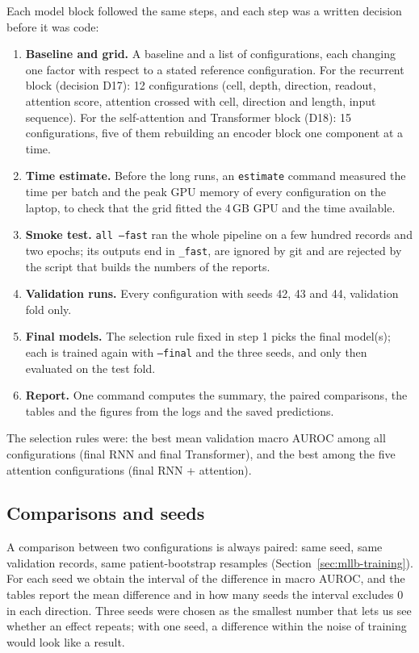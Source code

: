 Each model block followed the same steps, and each step was a written decision before it was code:
\begin{enumerate}[leftmargin=1.4em,itemsep=1pt]
  \item \textbf{Baseline and grid.} A baseline and a list of configurations, each changing one factor with
        respect to a stated reference configuration. For the recurrent block (decision D17): 12
        configurations (cell, depth, direction, readout, attention score, attention crossed with cell,
        direction and length, input sequence). For the self-attention and Transformer block (D18): 15
        configurations, five of them rebuilding an encoder block one component at a time.
  \item \textbf{Time estimate.} Before the long runs, an \texttt{estimate} command measured the time per
        batch and the peak GPU memory of every configuration on the laptop, to check that the grid fitted
        the 4\,GB GPU and the time available.
  \item \textbf{Smoke test.} \texttt{all --fast} ran the whole pipeline on a few hundred records and two
        epochs; its outputs end in \texttt{\_fast}, are ignored by git and are rejected by the script that
        builds the numbers of the reports.
  \item \textbf{Validation runs.} Every configuration with seeds 42, 43 and 44, validation fold only.
  \item \textbf{Final models.} The selection rule fixed in step 1 picks the final model(s); each is trained
        again with \texttt{--final} and the three seeds, and only then evaluated on the test fold.
  \item \textbf{Report.} One command computes the summary, the paired comparisons, the tables and the
        figures from the logs and the saved predictions.
\end{enumerate}
The selection rules were: the best mean validation macro AUROC among all configurations (final RNN and
final Transformer), and the best among the five attention configurations (final RNN + attention).

\subsection{Comparisons and seeds}

A comparison between two configurations is always paired: same seed, same validation records, same
patient-bootstrap resamples (Section~\ref{sec:mllb-training}). For each seed we obtain the interval of the
difference in macro AUROC, and the tables report the mean difference and in how many seeds the interval
excludes 0 in each direction. Three seeds were chosen as the smallest number that lets us see whether an
effect repeats; with one seed, a difference within the noise of training would look like a result.

